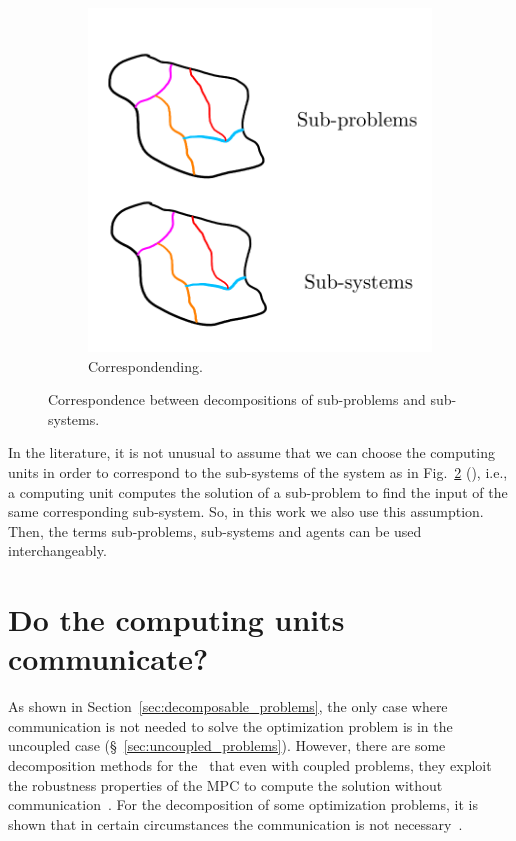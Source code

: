 \documentclass[../main.tex]{subfiles}
\begin{document}
\begin{figure}[h]
\begin{subfigure}{.4\textwidth}
    \includegraphics[width=\textwidth,clip,trim=0cm 1.8cm 0 2.5cm]{../img/corresponding_system_problem.png}
    \caption{Correspondending.}\label{fig:corresponding_division_system_problem}
  \end{subfigure}
  \caption{Correspondence between decompositions of sub-problems and
    sub-systems.}
\end{figure}

In the literature, it is not unusual to assume that we can choose the computing units in order to correspond to the sub-systems of the system as in Fig.~\ref{fig:corresponding_division_system_problem} (), i.e., a computing unit computes the solution of a sub-problem to find the input of the same corresponding sub-system.
So, in this work we also use this assumption.
Then, the terms sub-problems, sub-systems and agents can be used interchangeably.

\section{Do the computing units communicate?}

As shown in Section~\ref{sec:decomposable_problems}, the only case where communication is not needed to solve the optimization problem is in the uncoupled case (\S~\ref{sec:uncoupled_problems}).
However, there are some decomposition methods for the \dmpc\ that even with coupled problems, they exploit the robustness properties of the MPC to compute the solution without communication~\cite{VahidNaghaviEtAl2014}.
For the decomposition of some optimization problems, it is shown that in certain circumstances the communication is not necessary~\cite{VoulgarisElia2022}.
\end{document}
